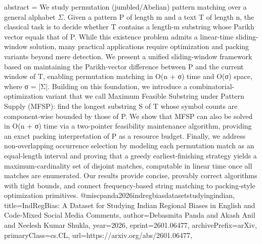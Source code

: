 {      abstract = {We study permutation (jumbled/Abelian) pattern matching over a general alphabet $Σ$. Given a pattern P of length m and a text T of length n, the classical task is to decide whether T contains a length-m substring whose Parikh vector equals that of P. While this existence problem admits a linear-time sliding-window solution, many practical applications require optimization and packing variants beyond mere detection. We present a unified sliding-window framework based on maintaining the Parikh-vector difference between P and the current window of T, enabling permutation matching in O(n + σ) time and O(σ) space, where σ = |Σ|. Building on this foundation, we introduce a combinatorial-optimization variant that we call Maximum Feasible Substring under Pattern Supply (MFSP): find the longest substring S of T whose symbol counts are component-wise bounded by those of P. We show that MFSP can also be solved in O(n + σ) time via a two-pointer feasibility maintenance algorithm, providing an exact packing interpretation of P as a resource budget. Finally, we address non-overlapping occurrence selection by modeling each permutation match as an equal-length interval and proving that a greedy earliest-finishing strategy yields a maximum-cardinality set of disjoint matches, computable in linear time once all matches are enumerated. Our results provide concise, provably correct algorithms with tight bounds, and connect frequency-based string matching to packing-style optimization primitives.}
}@misc{panda2026indregbiasdatasetstudyingindian,
      title={IndRegBias: A Dataset for Studying Indian Regional Biases in English and Code-Mixed Social Media Comments}, 
      author={Debasmita Panda and Akash Anil and Neelesh Kumar Shukla},
      year={2026},
      eprint={2601.06477},
      archivePrefix={arXiv},
      primaryClass={cs.CL},
      url={https://arxiv.org/abs/2601.06477},
}
